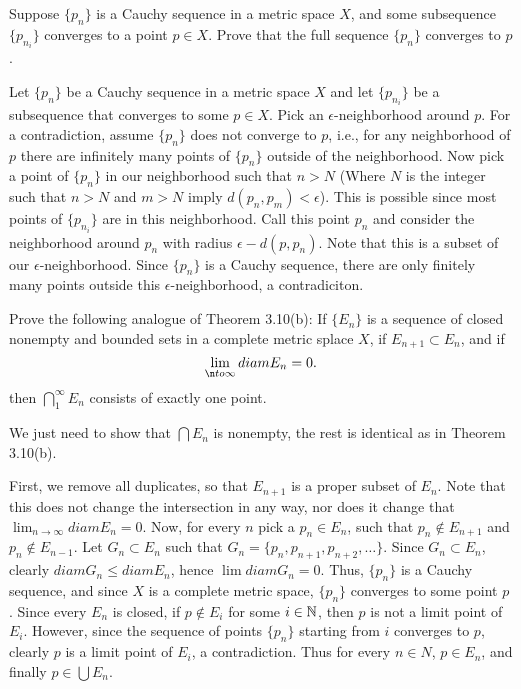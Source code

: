 \setcounter{problem}{19}
\begin{problem}
  Suppose $\{p_n\}$ is a Cauchy sequence in a metric space $X$, and some subsequence $\{p_{n_i}\}$ converges to a point $p \in X$.
  Prove that the full sequence $\{p_n\}$ converges to $p$.
\end{problem}

\begin{solution}
  Let $\{p_n\}$ be a Cauchy sequence in a metric space $X$ and let $\{p_{n_i}\}$ be a subsequence that converges to some $p \in X$.
  Pick an $\epsilon$-neighborhood around $p$.
  For a contradiction, assume $\{p_n\}$ does not converge to $p$, i.e., for any neighborhood of $p$ there are infinitely many points of $\{p_n\}$ outside of the neighborhood.
  Now pick a point of $\{p_{n}\}$ in our neighborhood such that $n > N$ (Where $N$ is the integer such that $n > N$ and $m > N$ imply $d(p_n, p_m) < \epsilon$).
  This is possible since most points of $\{p_{n_i}\}$ are in this neighborhood.
  Call this point $p_n$ and consider the neighborhood around $p_n$ with radius $\epsilon - d(p, p_n)$.
  Note that this is a subset of our $\epsilon$-neighborhood.
  Since $\{p_n\}$ is a Cauchy sequence, there are only finitely many points outside this $\epsilon$-neighborhood, a contradiciton.
\end{solution}

\begin{problem}
  Prove the following analogue of Theorem 3.10(b): If $\{E_n\}$ is a sequence of closed nonempty and bounded sets in a complete metric splace $X$, if $E_{n+1} \subset E_n$, and if 
  \[\lim_{\n to \infty} diam E_n = 0.\]
  then $\bigcap_1^{\infty} E_n$ consists of exactly one point.
\end{problem}

\begin{solution}
  We just need to show that $\bigcap E_n$ is nonempty, the rest is identical as in Theorem 3.10(b).

  First, we remove all duplicates, so that $E_{n + 1}$ is a proper subset of $E_n$.
  Note that this does not change the intersection in any way, nor does it change that $\lim_{n \to \infty} diam E_n = 0$.
  Now, for every $n$ pick a $p_n \in E_n$, such that $p_n \notin E_{n + 1}$ and $p_n \notin E_{n - 1}$.
  Let $G_n \subset E_n$ such that $G_n = \{p_n, p_{n + 1}, p_{n + 2}, \ldots\}$.
  Since $G_n \subset E_n$, clearly $diam G_n \le diam E_n$, hence $\lim diam G_n = 0$.
  Thus, $\{p_n\}$ is a Cauchy sequence, and since $X$ is a complete metric space, $\{p_n\}$ converges to some point $p$.
  Since every $E_n$ is closed, if $p \notin E_i$ for some $i \in \mathbb{N}$, then $p$ is not a limit point of $E_i$.
  However, since the sequence of points $\{p_n\}$ starting from $i$ converges to $p$, clearly $p$ is a limit point of $E_i$, a contradiction.
  Thus for every $n \in N$, $p \in E_n$, and finally $p \in \bigcup E_n$.
\end{solution}

